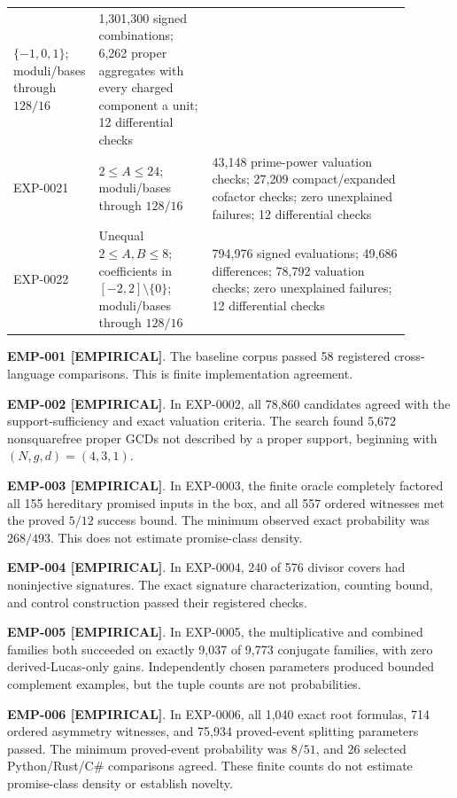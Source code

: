 \documentclass[11pt]{article}
\newcommand{\claimstatus}[2]{\textbf{#1 [#2]}}
\begin{document}
\begin{center}
\begin{tabular}{L{0.12\linewidth}L{0.28\linewidth}L{0.49\linewidth}}
\(\{-1,0,1\}\); moduli/bases through \(128/16\) &
1,301,300 signed combinations; 6,262 proper aggregates with every charged
component a unit; 12 differential checks \\
\addlinespace
EXP-0021 & \(2\le A\le24\); moduli/bases through \(128/16\) &
43,148 prime-power valuation checks; 27,209 compact/expanded cofactor checks;
zero unexplained failures; 12 differential checks \\
\addlinespace
EXP-0022 & Unequal \(2\le A,B\le8\); coefficients in
\([-2,2]\setminus\{0\}\); moduli/bases through \(128/16\) &
794,976 signed evaluations; 49,686 differences; 78,792 valuation checks;
zero unexplained failures; 12 differential checks \\
\bottomrule
\end{tabular}
\end{center}

\claimstatus{EMP-001}{EMPIRICAL}. The baseline corpus passed 58 registered
cross-language comparisons. This is finite implementation agreement.

\claimstatus{EMP-002}{EMPIRICAL}. In EXP-0002, all 78,860 candidates agreed
with the support-sufficiency and exact valuation criteria. The search found
5,672 nonsquarefree proper GCDs not described by a proper support, beginning
with \((N,g,d)=(4,3,1)\).

\claimstatus{EMP-003}{EMPIRICAL}. In EXP-0003, the finite oracle completely
factored all 155 hereditary promised inputs in the box, and all 557 ordered
witnesses met the proved \(5/12\) success bound. The minimum observed exact
probability was \(268/493\). This does not estimate promise-class density.

\claimstatus{EMP-004}{EMPIRICAL}. In EXP-0004, 240 of 576 divisor covers had
noninjective signatures. The exact signature characterization, counting bound,
and control construction passed their registered checks.

\claimstatus{EMP-005}{EMPIRICAL}. In EXP-0005, the multiplicative and combined
families both succeeded on exactly 9,037 of 9,773 conjugate families, with zero
derived-Lucas-only gains. Independently chosen parameters produced bounded
complement examples, but the tuple counts are not probabilities.

\claimstatus{EMP-006}{EMPIRICAL}. In EXP-0006, all 1,040 exact root formulas,
714 ordered asymmetry witnesses, and 75,934 proved-event splitting parameters
passed. The minimum proved-event probability was \(8/51\), and 26 selected
Python/Rust/C\# comparisons agreed. These finite counts do not estimate
promise-class density or establish novelty.
\end{document}
